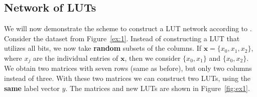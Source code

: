 \subsection{Network of LUTs}
We will now demonstrate the scheme to construct a LUT network according to \cite{bib:chatterjee2018learning}. Consider the dataset from Figure~\ref{ex:1}. Instead of constructing a LUT that utilizes all bits, we now take \textbf{random} subsets of the columns. If $\bm{x} = \{x_0,x_1,x_2\}$, where $x_j$ are the individual entries of $\bm{x}$, then we consider $\{x_0,x_1\}$ and $\{x_0,x_2\}$. We obtain two matrices with seven rows (same as before), but only two columns instead of three. With these two matrices we can construct two LUTs, using the \textbf{same} label vector $y$. The matrices and new LUTs are shown in Figure~\ref{fig:ex1}.

